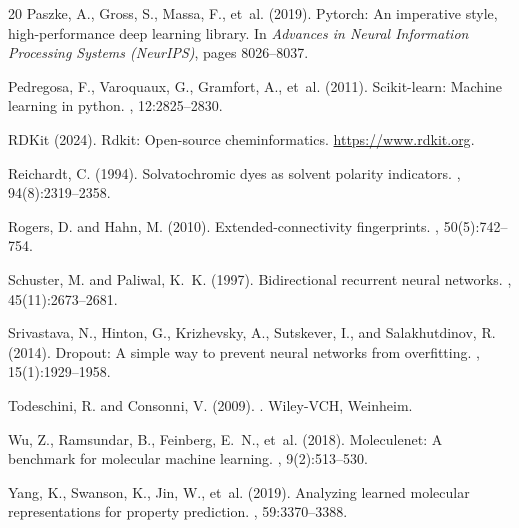 \documentclass[12pt]{article}
\begin{document}
\begin{thebibliography}{20}
Paszke, A., Gross, S., Massa, F., et~al. (2019).
\newblock Pytorch: An imperative style, high-performance deep learning library.
\newblock In {\em Advances in Neural Information Processing Systems (NeurIPS)}, pages 8026--8037.

Pedregosa, F., Varoquaux, G., Gramfort, A., et~al. (2011).
\newblock Scikit-learn: Machine learning in python.
, 12:2825--2830.

RDKit (2024).
\newblock Rdkit: Open-source cheminformatics.
\newblock \url{https://www.rdkit.org}.

Reichardt, C. (1994).
\newblock Solvatochromic dyes as solvent polarity indicators.
, 94(8):2319--2358.

Rogers, D. and Hahn, M. (2010).
\newblock Extended-connectivity fingerprints.
, 50(5):742--754.

Schuster, M. and Paliwal, K.~K. (1997).
\newblock Bidirectional recurrent neural networks.
, 45(11):2673--2681.

Srivastava, N., Hinton, G., Krizhevsky, A., Sutskever, I., and Salakhutdinov, R. (2014).
\newblock Dropout: A simple way to prevent neural networks from overfitting.
, 15(1):1929--1958.

Todeschini, R. and Consonni, V. (2009).
.
\newblock Wiley-VCH, Weinheim.

Wu, Z., Ramsundar, B., Feinberg, E.~N., et~al. (2018).
\newblock Moleculenet: A benchmark for molecular machine learning.
, 9(2):513--530.

Yang, K., Swanson, K., Jin, W., et~al. (2019).
\newblock Analyzing learned molecular representations for property prediction.
, 59:3370--3388.

\end{thebibliography}
\end{document}
